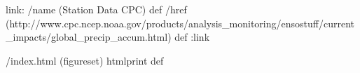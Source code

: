
link:
/name (Station Data CPC) def
/href (http://www.cpc.ncep.noaa.gov/products/analysis_monitoring/ensostuff/current_impacts/global_precip_accum.html) def
:link
\begin{ingrid}
/index.html {(figureset) htmlprint} def
\end{ingrid}